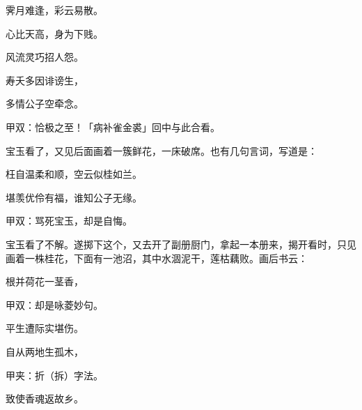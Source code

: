 \begin{poem}
    \begin{pl}霁月难逢，彩云易散。\end{pl}

    \begin{pl}心比天高，身为下贱。\end{pl}

    \begin{pl}风流灵巧招人怨。\end{pl}

    \begin{pl}寿夭多因诽谤生，\end{pl}

    \begin{pl}多情公子空牵念。\end{pl}
    \begin{note}甲双：恰极之至！「病补雀金裘」回中与此合看。\end{note}

\end{poem}


\begin{parag}
    宝玉看了，又见后面画着一簇鲜花，一床破席。也有几句言词，写道是：
\end{parag}


\begin{poem}
    \begin{pl}枉自温柔和顺，空云似桂如兰。\end{pl}

    \begin{pl}堪羡优伶有福，谁知公子无缘。\end{pl}

    \begin{note}甲双：骂死宝玉，却是自悔。\end{note}

\end{poem}


\begin{parag}
    宝玉看了不解。遂掷下这个，又去开了副册厨门，拿起一本册来，揭开看时，只见画着一株桂花，下面有一池沼，其中水涸泥干，莲枯藕败。画后书云：
\end{parag}


\begin{poem}
    \begin{pl}根并荷花一茎香，\end{pl}
    \begin{note}甲双：却是咏菱妙句。\end{note}

    \begin{pl}平生遭际实堪伤。\end{pl}

    \begin{pl}自从两地生孤木，\end{pl}
    \begin{note}甲夹：折（拆）字法。\end{note}

    \begin{pl}致使香魂返故乡。\end{pl}
\end{poem}


